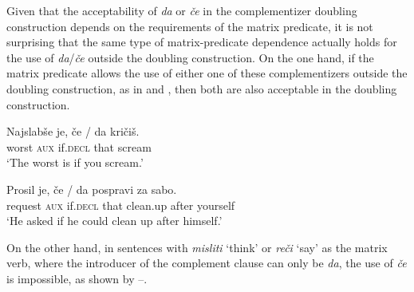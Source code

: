\documentclass[output=paper,
]{langscibook}
\begin{document}
\noindent Given that the acceptability of \textit{da} or \textit{če} in the complementizer doubling construction depends on the requirements of the matrix predicate, it is not surprising that the same type of matrix-predicate dependence actually holds for the use of \textit{da}/\textit{če} outside the doubling construction. On the one hand, if the matrix predicate allows the use of either one of these complementizers outside the doubling construction, as in  and , then both are also acceptable in the doubling construction. 

\begin{exe} 
\ex \label{ex:plesnicar:twentyfive}
\gll Najslabše 	je, 	če / \hspace{-2pt} da 		kričiš.\\
  worst		\textsc{aux}	if.\textsc{decl} {} {} that	scream\\
\trans `The worst is if you scream.'
\end{exe}


\begin{exe} 
\ex \label{ex:plesnicar:twentysix}
\gll Prosil 		je, 	če / \hspace{-2pt} da 		pospravi 	za 	sabo.\\
 request		\textsc{aux}	if.\textsc{decl} {} {} that	clean.up 	after	yourself \\
\trans `He asked if he could clean up after himself.'
\end{exe}

\noindent On the other hand, in sentences with \textit{misliti} `think' or \textit{reči} `say' as the matrix verb, where the introducer of the complement clause can only be \textit{da}, the use of \textit{če} is impossible, as shown by --. 

\begin{exe} 
\end{exe}


\begin{exe} 
\end{exe}
\end{document}
